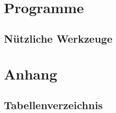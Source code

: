 \documentclass[
titlepage,						%
]
{scrreprt}
\begin{document}
\newpage
\chapter{Programme}
\section[Nützliche Werkzeuge]{Nützliche Werkzeuge}



\chapter{Anhang}
\section[Tabellenverzeichnis]{Tabellenverzeichnis}
\listoftables				%

%



\newpage

\end{document}
